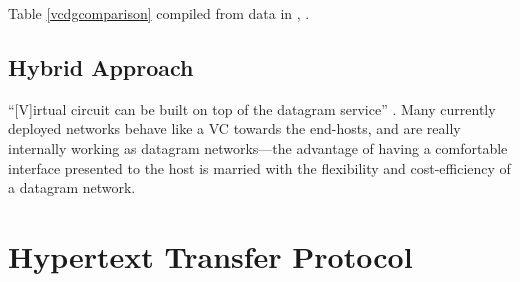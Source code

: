 \documentclass[10pt]{report}
\begin{document}
Table \ref{vcdgcomparison} compiled from data in \cite{kurose,russell},
\cite[p298--299]{stallings}.

%
%
%

\section{Hybrid Approach}

``[V]irtual circuit can be built on top of the datagram service''
\cite[p141]{russell}.  Many currently deployed networks behave like a VC towards the end-hosts,
and are really internally working as datagram networks---the advantage
of having a comfortable interface presented to the host is married with
the flexibility and cost-efficiency of a datagram network.




\chapter{Hypertext Transfer Protocol}
\thispagestyle{fancy}
\end{document}
